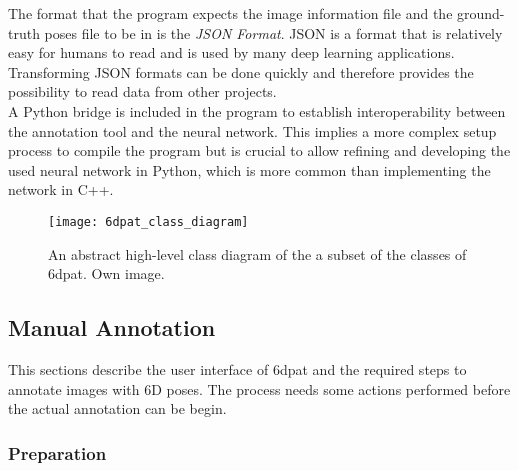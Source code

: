 The format that the program expects the image information file and the ground-truth poses file to be in is the \textit{JSON Format}. JSON is a format that is relatively easy for humans to read and is used by many deep learning applications. Transforming JSON formats can be done quickly and therefore provides the possibility to read data from other projects. \\

A Python bridge is included in the program to establish interoperability between the annotation tool and the neural network. This implies a more complex setup process to compile the program but is crucial to allow refining and developing the used neural network in Python, which is more common than implementing the network in C++. 

\begin{figure}[!tbp]
	\centering
    \texttt{[image: 6dpat\_class\_diagram]}
    \caption{An abstract high-level class diagram of the a subset of the classes of \gls{6dpat}. Own image.}
    \label{fig:6dpat_components}
\end{figure} 

\subsection{Manual Annotation} 

This sections describe the user interface of \gls{6dpat} and the required steps to annotate images with 6D poses. The process needs some actions performed before the actual annotation can be begin. 

\subsubsection{Preparation}

